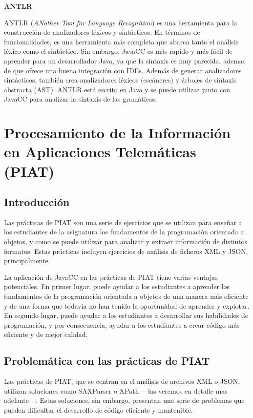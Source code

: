 \textbf{ANTLR}

ANTLR (\textit{ANother Tool for Language Recognition}) es una herramienta para la construcción de analizadores léxicos y sintácticos. En términos de funcionalidades, es una herramienta más completa que abarca tanto el análisis léxico como el sintáctico. Sin embargo, JavaCC es más rapido y más fácil de aprender para un desarrollador Java, ya que la sintaxis es muy parecida, ademas de que ofrece una buena integración con IDEs\cite{antlr}. Además de generar analizadores sintácticos, también crea analizadores léxicos (escáneres) y árboles de sintaxis abstracta (AST).
ANTLR está escrito en Java y se puede utilizar junto con JavaCC para analizar la sintaxis de las gramáticas.

\section{Procesamiento de la Información en Aplicaciones Telemáticas (PIAT)}
\subsection{Introducción}
Las prácticas de PIAT son una serie de ejercicios que se utilizan para enseñar a los estudiantes de la asignatura los fundamentos de la programación orientada a objetos, y como se puede utilizar para analizar y extraer información de distintos formatos. Estas prácticas incluyen ejercicios de análisis de ficheros XML y JSON, principalmente.

La aplicación de JavaCC en las prácticas de PIAT tiene varias ventajas potenciales. En primer lugar, puede ayudar a los estudiantes a aprender los fundamentos de la programación orientada a objetos de una manera más eficiente y de una forma que todavía no han tenido la oportunidad de aprender y explotar. En segundo lugar, puede ayudar a los estudiantes a desarrollar sus habilidades de programación, y por consecuencia, ayudar a los estudiantes a crear código más eficiente y de mejor calidad.
\subsection{Problemática con las prácticas de PIAT}

Las prácticas de PIAT, que se centran en el análisis de archivos XML o JSON,  utilizan soluciones como SAXParser o XPath ---las veremos en detalle mas adelante---. Estas soluciones, sin embargo, presentan una serie de problemas que pueden dificultar el desarrollo de código eficiente y mantenible.

